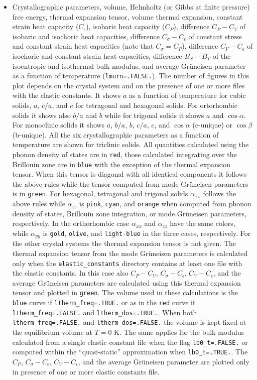 \documentclass[12pt,a4paper]{article}
\begin{document}
\begin{itemize}
\item
Crystallographic parameters, volume, Helmholtz (or Gibbs at finite pressure)
free energy, thermal expansion tensor, volume thermal expansion, constant
strain heat capacity ($C_\epsilon$), isobaric heat capacity ($C_P$),
difference $C_P-C_V$ of isobaric and isochoric heat capacities,
difference $C_\sigma-C_\epsilon$ of constant stress and 
constant strain heat capacities (note that $C_\sigma=C_P$), 
difference $C_V-C_\epsilon$ of isochoric and constant strain heat capacities, 
difference $B_S-B_T$ of the isoentropic and isothermal bulk modulus,
and average Gr\"uneisen parameter as a function of temperature 
(\texttt{lmurn=.FALSE.}). The number of
figures in this plot depends on the crystal system and on the presence
of one or more files with the elastic constants. It shows $a$ as a function
of temperature for cubic solids, $a$, $c/a$, and $c$ for tetragonal and 
hexagonal 
solids. For ortorhombic solids it shows also $b/a$ and $b$ while for 
trigonal solids
it shows $a$ and $\cos\alpha$. For monoclinic
solids it shows $a$, $b/a$, $b$, $c/a$, $c$, and $\cos\alpha$ (c-unique) or 
$\cos\beta$ (b-unique). All the six crystallographic parameters 
as a function of temperature are shown for triclinic solids. 
All quantities calculated using the phonon 
density of states are in \texttt{red}, those calculated integrating
over the Brillouin zone are in \texttt{blue} with the exception of the
thermal expansion tensor. When this tensor is diagonal with all identical
components it follows the above rules while the tensor computed 
from mode Gr\"uneisen parameters is in \texttt{green}. For hexagonal,  
tetragonal and trigonal solids $\alpha_{xx}$ follows the above rules 
while $\alpha_{zz}$ is \texttt{pink}, \texttt{cyan}, and \texttt{orange}
when computed from phonon density of states, Brillouin zone integration, 
or mode Gr\"uneisen parameters, respectively. 
In the orthorhombic case $\alpha_{xx}$ and $\alpha_{zz}$ have the same
colors, while $\alpha_{yy}$ is \texttt{gold}, \texttt{olive}, and 
\texttt{light-blue} in the three cases, respectively. For the other
crystal systems the thermal expansion tensor is not given.
The thermal expansion tensor from the mode Gr\"uneisen parameters is 
calculated only when the \texttt{elastic\_constants} directory contains at 
least one file with the elastic constants. In this case also 
$C_P-C_V$, $C_\sigma-C_\epsilon$, $C_V-C_\epsilon$, and the 
average Gr\"uneisen parameters are calculated using this thermal 
expansion tensor and plotted in \texttt{green}.
The volume used in these calculations is the \texttt{blue} curve 
if \texttt{ltherm\_freq=.TRUE.}
or as in the \texttt{red} curve if \texttt{ltherm\_freq=.FALSE.}
and \texttt{ltherm\_dos=.TRUE.}.
When both \texttt{ltherm\_freq=.FALSE.} and \texttt{ltherm\_dos=.FALSE.}
the volume is kept fixed at the equilibrium volume at $T=0$ K.
The same applies for the bulk modulus calculated from a single elastic
constant file when the flag \texttt{lb0\_t=.FALSE.} or computed 
within the ``quasi-static'' approximation when \texttt{lb0\_t=.TRUE.}. 
The $C_P$, $C_\sigma-C_\epsilon$, $C_V-C_\epsilon$, and  
the average Gr\"uneisen parameter are plotted only in presence of 
one or more elastic constants file. 


\end{itemize}
\end{document}
